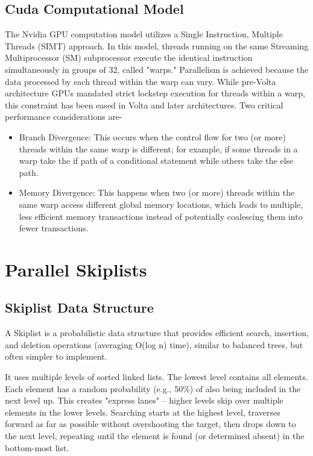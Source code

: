 \documentclass[12pt,a4paper]{article}
\begin{document}
\subsection{Cuda Computational Model}
The Nvidia GPU computation model utilizes a Single Instruction, Multiple Threads (SIMT) approach. In this model,
threads running on the same Streaming Multiprocessor (SM) subprocessor execute the identical instruction simultaneously in groups of 32, called "warps." Parallelism is achieved because the data processed by each thread within the warp can vary. While pre-Volta architecture GPUs mandated strict lockstep execution for threads within a warp, this constraint has been eased in Volta and later architectures. Two critical performance considerations are-
\begin{itemize}
    \item Branch Divergence: This occurs when the control flow for two (or more) threads within the same warp is different; for example, if some threads in a warp take the if path of a conditional statement while others take the else path. 
    \item Memory Divergence: This happens when two (or more) threads within the same warp access different global memory locations, which leads to multiple, less efficient memory transactions instead of potentially coalescing them into fewer transactions.
\end{itemize}

\section{Parallel Skiplists}
\subsection{Skiplist Data Structure}
A Skiplist is a probabilistic data structure that provides efficient search, insertion, and deletion operations (averaging O(log n) time), similar to balanced trees, but often simpler to implement.

It uses multiple levels of sorted linked lists. The lowest level contains all elements. Each element has a random probability (e.g., 50\%) of also being included in the next level up. This creates "express lanes" – higher levels skip over multiple elements in the lower levels. Searching starts at the highest level, traverses forward as far as possible without overshooting the target, then drops down to the next level, repeating until the element is found (or determined absent) in the bottom-most list.
\end{document}
